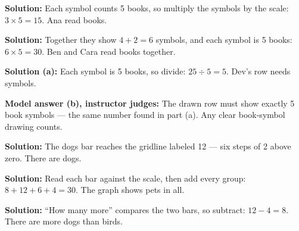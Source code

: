 \documentclass[12pt]{article}
\begin{document}



\textbf{Solution:} Each symbol counts 5 books, so multiply the symbols by the
scale: $3 \times 5 = 15$. Ana read  books.


\textbf{Solution:} Together they show $4 + 2 = 6$ symbols, and each symbol is
5 books: $6 \times 5 = 30$. Ben and Cara read  books together.


\textbf{Solution (a):} Each symbol is 5 books, so divide: $25 \div 5 = 5$.
Dev's row needs  symbols.

\textbf{Model answer (b), instructor judges:} The drawn row must show exactly
5 book symbols --- the same number found in part (a). Any clear book-symbol
drawing counts.


\textbf{Solution:} The dogs bar reaches the gridline labeled 12 --- six steps
of 2 above zero. There are  dogs.


\textbf{Solution:} Read each bar against the scale, then add every group:
$8 + 12 + 6 + 4 = 30$. The graph shows  pets in all.


\textbf{Solution:} ``How many more'' compares the two bars, so subtract:
$12 - 4 = 8$. There are  more dogs than birds.

\end{document}
